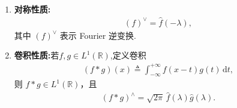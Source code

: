 \documentclass[../../main.tex]{subfiles}%
\begin{document}
\begin{proposition}
\begin{enumerate}[(1)]
\item\label{proposition:Fourier 变换的基本性质1-6} \textbf{对称性质:}
\begin{align*}
(f)^\vee=\hat{f}(-\lambda),
\end{align*}
其中 $(f)^\vee$ 表示 Fourier 逆变换.

\item\label{proposition:Fourier 变换的基本性质1-7} \textbf{卷积性质:}若$f,g\in L^1(\mathbb{R})$,定义卷积
\begin{align*}
(f*g)(x)\triangleq\int_{-\infty}^{+\infty}f(x-t)g(t)\,\mathrm{d}t,
\end{align*}
则 $f*g\in L^1(\mathbb{R})$，且
\begin{align*}
(f*g)^\wedge=\sqrt{2\pi}\,\hat{f}(\lambda)\hat{g}(\lambda).
\end{align*}
\end{enumerate}
\end{proposition}
\end{document}
